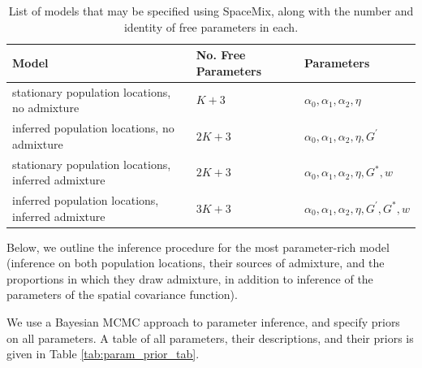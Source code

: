 \documentclass[12pt]{article}
\newcommand{\identifyadmixsource}[1]{{#1^{*}}}
\newcommand{\plr}[1]{{\it\color{green}{(#1)}}}
\begin{document}
\begin{centering}
\begin{table}
\begin{tabular}{| >{\centering\arraybackslash}m{6cm} | >{\centering\arraybackslash}m{3cm} | l |}
	\hline
	\textbf{Model} & \textbf{No. Free Parameters} & \textbf{Parameters}\\ \hline
	stationary population locations, no admixture & $K + 3$	& $\alpha_0,\alpha_1,\alpha_2,\eta$	\\ \hline
	inferred population locations, \hspace{0.5cm}no admixture & $2K + 3$	& $\alpha_0,\alpha_1,\alpha_2,\eta,G^{\prime}$	\\ \hline
	stationary population locations, inferred admixture & $2K + 3$	& $\alpha_0,\alpha_1,\alpha_2,\eta,\identifyadmixsource{G},w$	\\ \hline
	inferred population locations, inferred admixture & $3K + 3$	&$\alpha_0,\alpha_1,\alpha_2,\eta,G^{\prime},\identifyadmixsource{G},w$	\\
	\hline
\end{tabular}
\caption{
    List of models that may be specified using SpaceMix, along with the number and identity of free parameters in each.
    \plr{Maybe this table should be what the parameters are and what they do instead? And then say which can be inferred at once.}
}\label{tab:model_options}
\end{table}
\end{centering}

Below, we outline the inference procedure for the most parameter-rich model (inference on both population locations, their sources of admixture, and the proportions in which they draw admixture, in addition to inference of the parameters of the spatial covariance function).

We use a Bayesian MCMC approach to parameter inference, and specify priors on all parameters.  A table of all parameters, their descriptions, and their priors is given in Table \ref{tab:param_prior_tab}.
\end{document}
